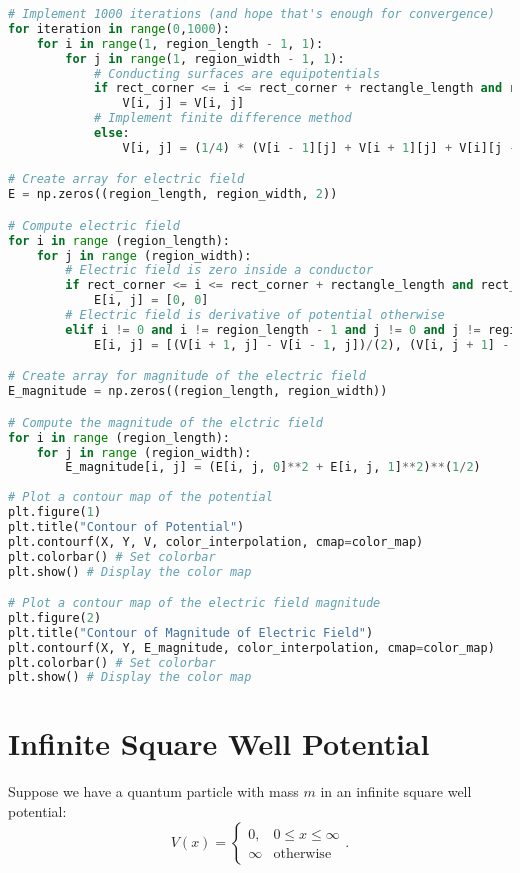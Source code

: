 \documentclass{article}
\begin{document}
\begin{lstlisting}[language=Python]
# Implement 1000 iterations (and hope that's enough for convergence)
for iteration in range(0,1000):
    for i in range(1, region_length - 1, 1):
        for j in range(1, region_width - 1, 1):
            # Conducting surfaces are equipotentials
            if rect_corner <= i <= rect_corner + rectangle_length and rect_corner <= j <= rect_corner + rectangle_width:
                V[i, j] = V[i, j]
            # Implement finite difference method                
            else:
                V[i, j] = (1/4) * (V[i - 1][j] + V[i + 1][j] + V[i][j - 1] + V[i][j + 1])

# Create array for electric field
E = np.zeros((region_length, region_width, 2))

# Compute electric field
for i in range (region_length):
    for j in range (region_width):
        # Electric field is zero inside a conductor
        if rect_corner <= i <= rect_corner + rectangle_length and rect_corner <= j <= rect_corner + rectangle_width:
            E[i, j] = [0, 0]
        # Electric field is derivative of potential otherwise
        elif i != 0 and i != region_length - 1 and j != 0 and j != region_width - 1:
            E[i, j] = [(V[i + 1, j] - V[i - 1, j])/(2), (V[i, j + 1] - V[i, j - 1])/(2)]

# Create array for magnitude of the electric field
E_magnitude = np.zeros((region_length, region_width))

# Compute the magnitude of the elctric field
for i in range (region_length):
    for j in range (region_width):
        E_magnitude[i, j] = (E[i, j, 0]**2 + E[i, j, 1]**2)**(1/2)
        
# Plot a contour map of the potential
plt.figure(1)
plt.title("Contour of Potential")
plt.contourf(X, Y, V, color_interpolation, cmap=color_map)
plt.colorbar() # Set colorbar
plt.show() # Display the color map

# Plot a contour map of the electric field magnitude
plt.figure(2)
plt.title("Contour of Magnitude of Electric Field")
plt.contourf(X, Y, E_magnitude, color_interpolation, cmap=color_map)
plt.colorbar() # Set colorbar
plt.show() # Display the color map
\end{lstlisting}

\section{Infinite Square Well Potential}

Suppose we have a quantum particle with mass $m$ in an infinite square well potential:
\begin{equation*}
    V(x) = \begin{cases} 0, & 0 \leqslant x \leqslant \infty \\ \infty & \text{otherwise} \end{cases}.
\end{equation*}
\end{document}
